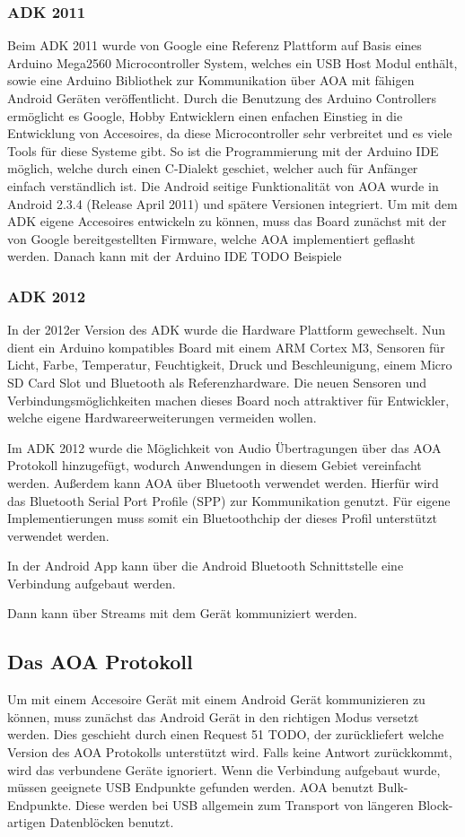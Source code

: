 \documentclass[12pt,journal,compsoc]{IEEEtran}
\begin{document}
\subsubsection{ADK 2011}
Beim ADK 2011 wurde von Google eine
Referenz Plattform auf Basis eines Arduino Mega2560 Microcontroller System, welches ein USB Host Modul enthält, sowie eine Arduino Bibliothek zur Kommunikation über AOA mit fähigen Android Geräten veröffentlicht.
Durch die Benutzung des Arduino Controllers ermöglicht es Google, Hobby Entwicklern einen enfachen Einstieg in die Entwicklung von Accesoires, da diese Microcontroller sehr verbreitet und es viele Tools für diese Systeme gibt.
So ist die Programmierung mit der Arduino IDE möglich, welche durch einen C-Dialekt geschiet, welcher auch für Anfänger einfach verständlich ist.
Die Android seitige Funktionalität von AOA wurde in Android 2.3.4 (Release April 2011) und spätere Versionen integriert. 
Um mit dem ADK eigene Accesoires entwickeln zu können, muss das Board zunächst mit der von Google bereitgestellten Firmware, welche AOA implementiert geflasht werden.
Danach kann mit der Arduino IDE 
TODO Beispiele
\subsubsection{ADK 2012}
In der 2012er Version des ADK wurde die Hardware Plattform gewechselt. Nun dient ein Arduino kompatibles Board mit einem ARM Cortex M3, Sensoren für Licht, Farbe, Temperatur, Feuchtigkeit, Druck und Beschleunigung, einem Micro SD Card Slot und Bluetooth als Referenzhardware.
Die neuen Sensoren und Verbindungsmöglichkeiten machen dieses Board noch attraktiver für Entwickler, welche eigene Hardwareerweiterungen vermeiden wollen.

Im ADK 2012 wurde die Möglichkeit von Audio Übertragungen über das AOA Protokoll hinzugefügt, wodurch Anwendungen in diesem Gebiet vereinfacht werden.
Außerdem kann AOA über Bluetooth verwendet werden. Hierfür wird das Bluetooth Serial Port Profile (SPP) zur Kommunikation genutzt. Für eigene Implementierungen muss somit ein Bluetoothchip der dieses Profil unterstützt verwendet werden.


In der Android App kann über die Android Bluetooth Schnittstelle eine Verbindung aufgebaut werden.

Dann kann über Streams mit dem Gerät kommuniziert werden.

\subsection{Das AOA Protokoll}
Um mit einem Accesoire Gerät mit einem Android Gerät kommunizieren zu können, muss zunächst das Android Gerät in den richtigen Modus versetzt werden.
Dies geschieht durch einen Request 51 TODO, der zurückliefert welche Version des AOA Protokolls unterstützt wird. Falls keine Antwort zurückkommt, wird das verbundene Geräte ignoriert.
Wenn die Verbindung aufgebaut wurde, müssen geeignete USB Endpunkte gefunden werden. AOA benutzt Bulk-Endpunkte. Diese werden bei USB allgemein zum Transport von längeren Block-artigen Datenblöcken benutzt.
\end{document}
